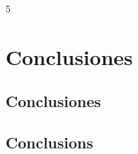 5%

\cleardoublepage


\chapter{Conclusiones}
\label{makereference5}

\section{Conclusiones}
\label{makereference5.1}

\section{Conclusions}
\label{makereference5.2}
